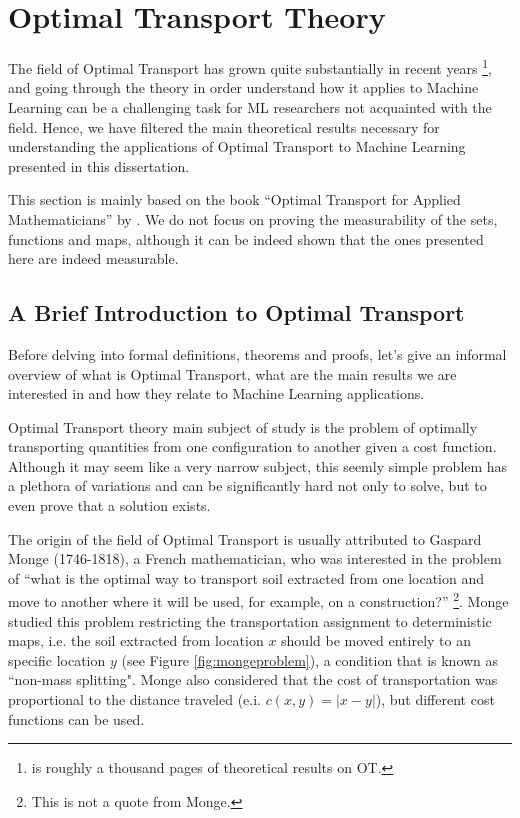 \newpage
\section{Optimal Transport Theory}

The field of Optimal Transport has grown quite substantially in recent years
\footnote{\citet{villani2008optimal} is roughly a thousand pages of theoretical results on OT.},
and going through the theory in order understand how it applies to Machine Learning can be a challenging task for
ML researchers not acquainted with the field.
Hence, we have filtered the main theoretical
results necessary for understanding the applications of Optimal Transport to Machine Learning
presented in this dissertation.

This section is mainly based on the book
``Optimal Transport for Applied Mathematicians'' by
\citet{santambrogio2015optimal}. We do not focus
on proving the measurability of the sets, functions and maps, although it can be indeed shown
that the ones presented here are indeed measurable.

\subsection{A Brief Introduction to Optimal Transport}

Before delving into formal definitions, theorems and proofs, let's give an informal overview of what is
Optimal Transport, what are the main results we are interested in and how they relate to Machine Learning applications.

Optimal Transport theory main subject of study is the problem of optimally transporting
quantities from one configuration to another given a cost function. Although it may seem like a very narrow subject,
this seemly simple problem has a plethora of variations and can be significantly hard not only to solve,
but to even prove that a solution exists.

The origin of the field of Optimal Transport is usually
attributed to Gaspard Monge (1746-1818), a French mathematician, who was interested in the problem
of ``what is the optimal way to transport soil extracted from one location and move to another where it will be used,
for example, on a construction?''
\footnote{This is not a quote from Monge.}\citep{villani2008optimal}.
Monge studied this problem restricting the transportation assignment to deterministic maps, i.e. the soil
extracted from location $x$ should be moved entirely to an specific location $y$ (see Figure \ref{fig:mongeproblem}),
a condition that is known as ``non-mass splitting". Monge also considered that the cost of transportation
was proportional to the distance traveled (e.i. $c(x,y) = |x-y|$), but different cost functions can be used.

